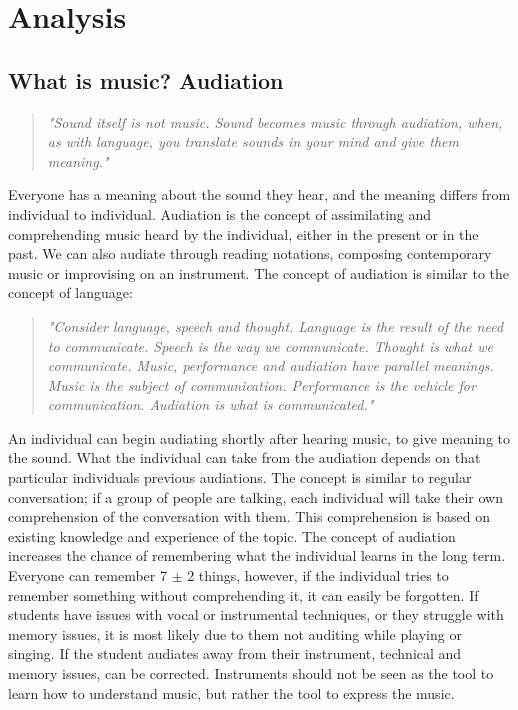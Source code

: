 \chapter{Analysis}\label{chap:analysis}
\section{What is music? Audiation} 
\begin{quote}
	
	\textit{"Sound itself is not music. Sound becomes music through audiation, when, as with language, you translate sounds in your mind and give them meaning\cite{audiation}."}\\
\end{quote}

Everyone has a meaning about the sound they hear, and the meaning differs from individual to individual\cite{audiation}. Audiation is the concept of assimilating and comprehending music heard by the individual, either in the present or in the past. We can also audiate through reading notations, composing contemporary music or improvising on an instrument.
The concept of audiation is similar to the concept of language\cite{audiation}: \\

\begin{quote}
	\textit{"Consider language, speech and thought. Language is the result of the need to communicate. Speech is the way we communicate. Thought is what we communicate. Music, performance and audiation have parallel meanings. Music is the subject of communication. Performance is the vehicle for communication. Audiation is what is communicated\cite{audiation}."}\\
\end{quote}

An individual can begin audiating shortly after hearing music, to give meaning to the sound. What the individual can take from the audiation depends on that particular individuals previous audiations\cite{audiation}. The concept is similar to regular conversation; if a group of people are talking, each individual will take their own comprehension of the conversation with them. This comprehension is based on existing knowledge and experience of the topic\cite{audiation}. 
The concept of audiation increases the chance of remembering what the individual learns in the long term. Everyone can remember 7 $\pm$ 2 things\cite{gestalt}, however, if the individual tries to remember something without comprehending it, it can easily be forgotten. If students have issues with vocal or instrumental techniques, or they struggle with memory issues, it is most likely due to them not auditing while playing or singing. If the student audiates away from their instrument, technical and memory issues, can be corrected. Instruments should not be seen as the tool to learn how to understand music, but rather the tool to express the music\cite{audiation}.\\

